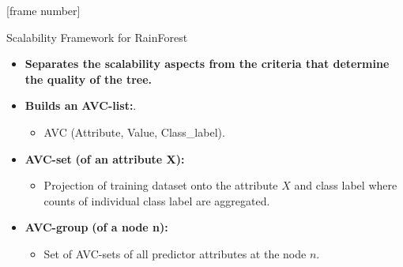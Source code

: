 \documentclass[aspectratio=169,t,table]{beamer}
\begin{document}
  {
    [frame number]
    \begin{frame}{Scalability Framework for RainForest}
      \begin{itemize}
        \item \textbf{Separates the scalability aspects from the criteria that determine the quality of the tree.}
        \item \textbf{Builds an} \textbf{\color{airforceblue}AVC-list:}.
        \begin{itemize}
          \item AVC (Attribute, Value, Class\_label).
        \end{itemize}
        \item \textbf{\color{airforceblue}AVC-set} \textbf{(of an attribute X):}
        \begin{itemize}
          \item Projection of training dataset onto the attribute $X$ and class label where counts of individual class label are aggregated.
        \end{itemize}
        \item \textbf{\color{airforceblue}AVC-group} \textbf{(of a node n):}
        \begin{itemize}
          \item Set of AVC-sets of all predictor attributes at the node $n$.
        \end{itemize}
      \end{itemize}
    \end{frame}
  }
\end{document}
